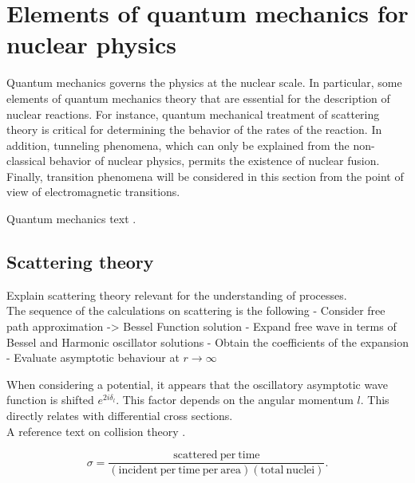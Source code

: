 \documentclass[openany]{book}
\begin{document}
\section{Elements of quantum mechanics for nuclear physics} \label{sec:quantumMechanics}

Quantum mechanics governs the physics at the nuclear scale. In particular, some elements of quantum mechanics theory that are essential for the description of nuclear reactions. For instance, quantum mechanical treatment of scattering theory is critical for determining the behavior of the rates of the reaction. In addition, tunneling phenomena, which can only be explained from the non-classical behavior of nuclear physics, permits the existence of nuclear fusion. Finally, transition phenomena will be considered in this section from the point of view of electromagnetic transitions. 

Quantum mechanics text \cite{dick_2016}.

\subsection{Scattering theory} \label{sub:scatteringTheory}


Explain scattering theory relevant for the understanding of  processes. \\

The sequence of the calculations on scattering is the following
-	Consider free path approximation -> Bessel Function solution  
-	Expand free wave in terms of Bessel and Harmonic oscillator solutions
-	Obtain the coefficients of the expansion 
-	Evaluate asymptotic behaviour at $r \rightarrow \infty$

When considering a potential, it appears that the oscillatory asymptotic wave function is shifted $e^{2i\delta_l}$. This factor depends on the angular momentum $l$. This directly relates with differential cross sections. \\

A reference text on collision theory \cite{joachain_1983}.

\begin{equation} \label{eq:crossSection_definition}
	\sigma  = \frac{\mathrm{scattered \ per \ time}}{(\mathrm{incident \ per \ time \ per \ area} )(\mathrm{total \ nuclei})}.
\end{equation}
\end{document}
